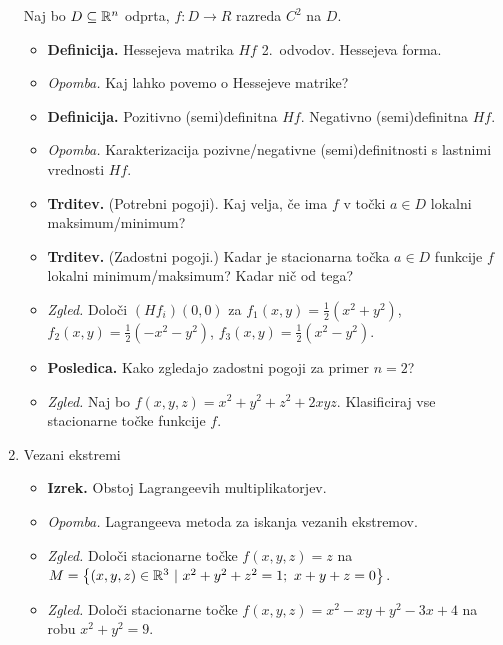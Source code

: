 \begin{enumerate}
    Naj bo $D \subseteq \mathbb{R}^n$ odprta, $f: D \to R$ razreda $C^2$ na $D$.
    \begin{itemize}
        \item \colorbox{purple!30}{\textbf{Definicija.}} Hessejeva matrika $Hf$ 2.\ odvodov. Hessejeva forma.
        \item \colorbox{yellow!30}{\emph{Opomba.}} Kaj lahko povemo o Hessejeve matrike?
        \item \colorbox{purple!30}{\textbf{Definicija.}} Pozitivno (semi)definitna $Hf$. Negativno (semi)definitna $Hf$.
        \item \colorbox{yellow!30}{\emph{Opomba.}} Karakterizacija pozivne/negativne (semi)definitnosti s lastnimi vrednosti $Hf$.
        \item \colorbox{blue!30}{\textbf{Trditev.}} (Potrebni pogoji). Kaj velja, če ima $f$ v točki $a \in D$ lokalni maksimum/minimum?
        \item \colorbox{blue!30}{\textbf{Trditev.}} (Zadostni pogoji.) Kadar je stacionarna točka $a \in D$ funkcije $f$ lokalni minimum/maksimum? Kadar nič od tega?
        \item \colorbox{yellow!30}{\emph{Zgled.}} Določi $(Hf_i)(0,0)$ za $f_1(x,y) = \frac{1}{2}(x^2+y^2)$, $f_2(x,y) = \frac{1}{2}(-x^2-y^2)$, $f_3(x,y) = \frac{1}{2}(x^2-y^2)$.
        \item \colorbox{orange!30}{\textbf{Posledica.}} Kako zgledajo zadostni pogoji za primer $n = 2$?
        \item \colorbox{yellow!30}{\emph{Zgled.}} Naj bo $f(x,y,z) = x^2+y^2+z^2 + 2xyz$. Klasificiraj vse stacionarne točke funkcije $f$.
    \end{itemize}

    \item Vezani ekstremi
    
    \begin{itemize}
        \item \colorbox{blue!30}{\textbf{Izrek.}} Obstoj Lagrangeevih multiplikatorjev.
        \item \colorbox{yellow!30}{\emph{Opomba.}} Lagrangeeva metoda za iskanja vezanih ekstremov.
        \item \colorbox{yellow!30}{\emph{Zgled.}} Določi stacionarne točke $f(x,y,z)=z$ na $M = \left\{(x,y,z) \in \mathbb{R}^3 \ | \ x^2+y^2+z^2=1; \ x+ y + z = 0\right\}$.
        \item \colorbox{yellow!30}{\emph{Zgled.}} Določi stacionarne točke  $f(x,y,z)= x^2 - xy +y^2 - 3x +4$ na robu $x^2 + y^2 = 9$. 
    \end{itemize}
\end{enumerate}
